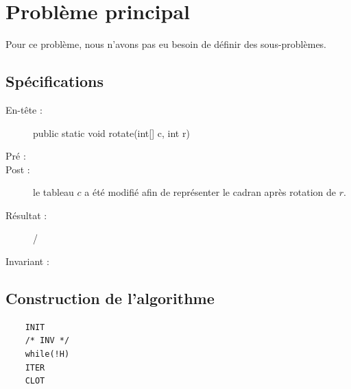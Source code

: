 	\section{Problème principal}
	Pour ce problème, nous n’avons pas eu besoin de définir des sous-problèmes.
	
	\subsection{Spécifications}
		\begin{description}
			\item[En-tête :] public static void rotate(int[] c, int r)
			\item[Pré :] 
			\item [Post :] le tableau $c$ a été modifié afin de représenter le cadran après rotation de $r$.
			\item [Résultat :] /
		\end{description}

		\begin{description}
			\item[Invariant  :] 
		\end{description}
	\subsection{Construction de l’algorithme}
	
	\begin{lstlisting}
	INIT
	/* INV */
	while(!H)
	ITER
	CLOT
	\end{lstlisting}
	
